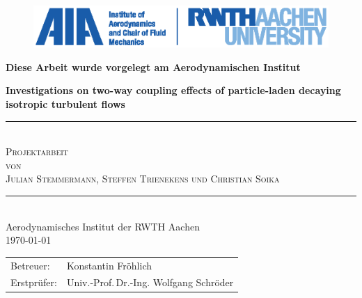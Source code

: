 \documentclass[11pt,a4paper,openany,oneside,parskip=half*]{article}
\newcommand{\HRule}{\rule{\linewidth}{0.5mm}}  %
\begin{document}
\begin{titlepage}
\begin{figure}[htp]
\vspace*{-3cm} 
\hspace*{2.7cm}  
\includegraphics{./Titelseite/rwth_aia_en_rgb.eps}
\end{figure}
\begin{center}
\textbf{Diese Arbeit wurde vorgelegt am Aerodynamischen Institut}
\end{center}
\begin{center} %
\vspace*{4.2cm} %
{ \huge \bfseries Investigations on two-way coupling effects of particle-laden decaying isotropic turbulent flows}\\[0.3cm] %
\HRule \\[0.5cm] %
\textsc{\Large{Projektarbeit}}\\ %
\textsc{\Large{von}}\\
\textsc{\LARGE{Julian Stemmermann, Steffen Trienekens und Christian Soika}}\\[0.5cm]
\HRule \\[0.4cm]
{\Large{Aerodynamisches Institut der RWTH Aachen}}\\[.5cm]
{\large \today} \\[1.5cm] %
\vfill %
\begin{flushleft} \large  %
\begin{tabular}{ll} %
Betreuer: &Konstantin Fr\"ohlich \\
Erstpr\"ufer: &Univ.-Prof.\,Dr.-Ing. Wolfgang Schr\"oder
\end{tabular}
\end{flushleft}
\vfill %
\end{center}
\end{titlepage}

\end{document}
